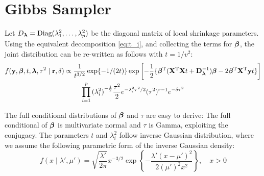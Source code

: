 \documentclass[chapters]{uamaththesis}
\begin{document}


\section{Gibbs Sampler}

Let $ D_{\boldsymbol{\lambda}} = \text{Diag}(\lambda_1^2, \ldots, \lambda_p^2)$ be the diagonal matrix of local shrinkage parameters. 
Using the equivalent decomposition \eqref{eq:t_i}, and collecting the terms for $\boldsymbol{\beta}$, the joint distribution can be re-written as follows with $t = 1/v^2$: 
\begin{multline}
f({\bf y}, \boldsymbol{\beta}, t, \boldsymbol{\lambda}, \tau^2 \mid {\bf r}, \delta) \propto 
\frac{1}{t^{3/2}} \exp\{-{1}/({2 t}) \} \exp \left[- \frac{1}{2} \{ \boldsymbol{\beta}^{\rm T}({\bf X}^{\rm T} {\bf X} t + {\bf D}_{\boldsymbol{\lambda}}^{-1})\boldsymbol{\beta} - 2 \boldsymbol{\beta}^{\rm T} {\bf X}^{\rm T} {\bf y} t \}\right] \\
\prod_{i=1}^{p} {(\lambda_i^2)}^{-\frac{1}{2}} \frac{\tau^2}{2} e^{-\lambda_i^2\tau^2/2} (\tau^2)^{r-1} e^{-\delta \tau^2} \label{eq:joint-beta}
\end{multline}

The full conditional distributions of $\boldsymbol{\beta}$ and $\tau$ are easy to derive: The full conditional of $\boldsymbol{\beta}$ is multivariate normal and $\tau$ is Gamma, exploiting the conjugacy. The parameters $t$ and $\lambda_i^2$ follow inverse Gaussian distribution, where we assume the following parametric form of the inverse Gaussian density:
\[
f(x \mid \lambda', \mu') = \sqrt{\frac{\lambda'}{2\pi}} x^{-3/2} \exp\left\{ - \frac{\lambda'(x-\mu')^2}{2(\mu')^2 x^2} \right \}, \quad x > 0 
\]
\end{document}
